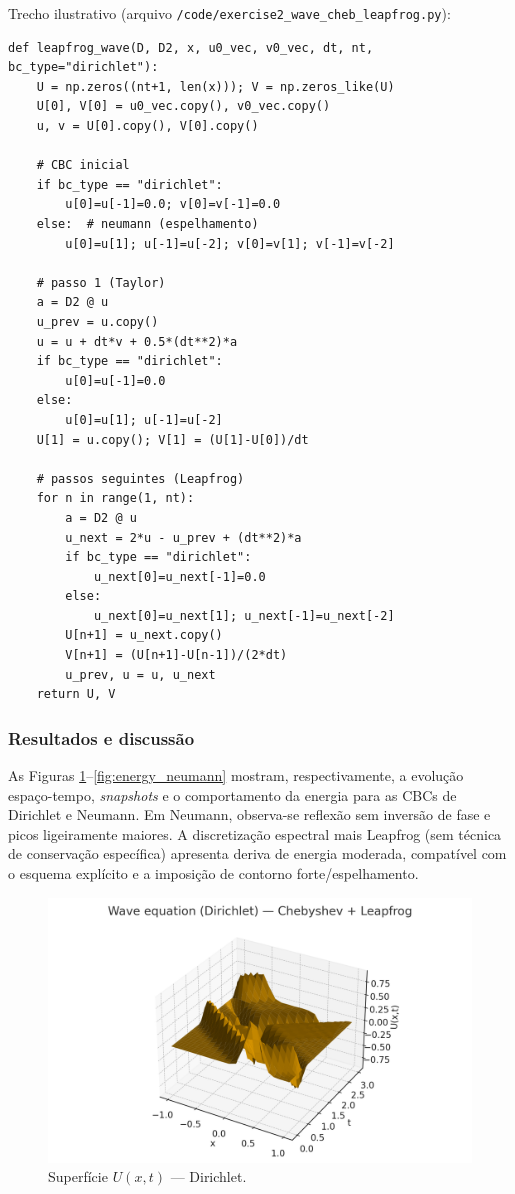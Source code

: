 \documentclass[12pt,a4paper]{article}
\begin{document}
\noindent Trecho ilustrativo (arquivo \texttt{/code/exercise2\_wave\_cheb\_leapfrog.py}):
\begin{verbatim}
def leapfrog_wave(D, D2, x, u0_vec, v0_vec, dt, nt, bc_type="dirichlet"):
    U = np.zeros((nt+1, len(x))); V = np.zeros_like(U)
    U[0], V[0] = u0_vec.copy(), v0_vec.copy()
    u, v = U[0].copy(), V[0].copy()

    # CBC inicial
    if bc_type == "dirichlet":
        u[0]=u[-1]=0.0; v[0]=v[-1]=0.0
    else:  # neumann (espelhamento)
        u[0]=u[1]; u[-1]=u[-2]; v[0]=v[1]; v[-1]=v[-2]

    # passo 1 (Taylor)
    a = D2 @ u
    u_prev = u.copy()
    u = u + dt*v + 0.5*(dt**2)*a
    if bc_type == "dirichlet":
        u[0]=u[-1]=0.0
    else:
        u[0]=u[1]; u[-1]=u[-2]
    U[1] = u.copy(); V[1] = (U[1]-U[0])/dt

    # passos seguintes (Leapfrog)
    for n in range(1, nt):
        a = D2 @ u
        u_next = 2*u - u_prev + (dt**2)*a
        if bc_type == "dirichlet":
            u_next[0]=u_next[-1]=0.0
        else:
            u_next[0]=u_next[1]; u_next[-1]=u_next[-2]
        U[n+1] = u_next.copy()
        V[n+1] = (U[n+1]-U[n-1])/(2*dt)
        u_prev, u = u, u_next
    return U, V
\end{verbatim}

\subsubsection{Resultados e discussão}
As Figuras \ref{fig:wave_dirichlet_surface}--\ref{fig:energy_neumann} mostram, respectivamente, a evolução espaço-tempo, \emph{snapshots} e o comportamento da energia para as CBCs de Dirichlet e Neumann.
Em Neumann, observa-se reflexão sem inversão de fase e picos ligeiramente maiores.
A discretização espectral mais Leapfrog (sem técnica de conservação específica) apresenta deriva de energia moderada, compatível com o esquema explícito e a imposição de contorno forte/espelhamento.

\begin{figure}[H]\centering
\includegraphics[width=.85\linewidth]{figures/wave_dirichlet_surface.png}
\caption{Superfície \(U(x,t)\) — Dirichlet.}\label{fig:wave_dirichlet_surface}
\end{figure}
\end{document}
